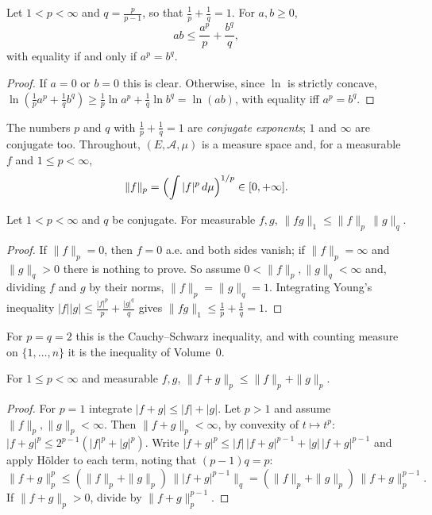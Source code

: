 \begin{lemma}\label{lem:young}
Let $1<p<\infty$ and $q=\frac p{p-1}$, so that $\frac1p+\frac1q=1$. For $a,b\ge0$,
\[ab\le\frac{a^p}p+\frac{b^q}q,\]
with equality if and only if $a^p=b^q$.
\end{lemma}
\begin{proof}
If $a=0$ or $b=0$ this is clear. Otherwise, since $\ln$ is strictly concave, $\ln(\frac1pa^p+\frac1qb^q)\ge\frac1p\ln a^p+\frac1q\ln b^q=\ln(ab)$, with equality iff $a^p=b^q$.
\end{proof}

The numbers $p$ and $q$ with $\frac1p+\frac1q=1$ are \emph{conjugate exponents}; $1$ and $\infty$ are conjugate too. Throughout, $(E,\mathcal A,\mu)$ is a measure space and, for a measurable $f$ and
$1\le p<\infty$,
\[\|f\|_p=\Bigl(\int|f|^p\,d\mu\Bigr)^{1/p}\in[0,+\infty].\]

\begin{theorem}\label{thm:holder}
Let $1<p<\infty$ and $q$ be conjugate. For measurable $f,g$, $\|fg\|_1\le\|f\|_p\,\|g\|_q$.
\end{theorem}
\begin{proof}
If $\|f\|_p=0$, then $f=0$ a.e. and both sides vanish; if $\|f\|_p=\infty$ and $\|g\|_q>0$ there is nothing to prove. So assume $0<\|f\|_p,\|g\|_q<\infty$ and, dividing $f$ and $g$ by their norms,
$\|f\|_p=\|g\|_q=1$. Integrating Young's inequality $|f||g|\le\frac{|f|^p}p+\frac{|g|^q}q$ gives $\|fg\|_1\le\frac1p+\frac1q=1$.
\end{proof}

For $p=q=2$ this is the Cauchy--Schwarz inequality, and with counting measure on $\{1,\dots,n\}$ it is the inequality of Volume~0.

\begin{theorem}\label{thm:minkowski}
For $1\le p<\infty$ and measurable $f,g$, $\|f+g\|_p\le\|f\|_p+\|g\|_p$.
\end{theorem}
\begin{proof}
For $p=1$ integrate $|f+g|\le|f|+|g|$. Let $p>1$ and assume $\|f\|_p,\|g\|_p<\infty$. Then $\|f+g\|_p<\infty$, by convexity of $t\mapsto t^p$: $|f+g|^p\le2^{p-1}(|f|^p+|g|^p)$. Write
$|f+g|^p\le|f|\,|f+g|^{p-1}+|g|\,|f+g|^{p-1}$ and apply H\"older to each term, noting that $(p-1)q=p$:
\[\|f+g\|_p^p\le(\|f\|_p+\|g\|_p)\,\bigl\||f+g|^{p-1}\bigr\|_q=(\|f\|_p+\|g\|_p)\,\|f+g\|_p^{p-1}.\]
If $\|f+g\|_p>0$, divide by $\|f+g\|_p^{p-1}$.
\end{proof}

